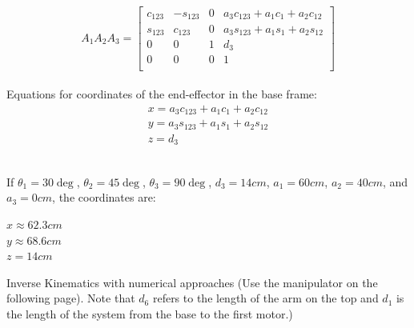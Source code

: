 \documentclass[12pt]{exam}
\begin{document}
\begin{questions}
\begin{parts}
\begin{center}
\[            \]
            \[
                A_1A_2A_3 =
                \begin{bmatrix}
                    c_{123} & -s_{123} & 0 & a_3c_{123} + a_1c_1 + a_2c_{12} \\
                    s_{123} & c_{123} & 0 & a_3s_{123} + a_1s_1 + a_2s_{12} \\
                    0 & 0 & 1 & d_3 \\
                    0 & 0 & 0 & 1 \\
                \end{bmatrix}
            \]
            \vspace{5mm} \\
            Equations for coordinates of the end-effector in the base frame:
            \\
            \begin{align}
                x = a_3c_{123} + a_1c_1 + a_2c_{12} \\
                y = a_3s_{123} + a_1s_1 + a_2s_{12} \\
                z = d_3
            \end{align}
            \\
        \end{center}
        If $\theta_1 = 30\deg$, $\theta_2 = 45\deg$, $\theta_3 = 90\deg$, $d_3 = 14 cm$, $a_1 = 60 cm$, $a_2 = 40 cm$, and $a_3 = 0 cm$, the coordinates are:
        \\
        \begin{center}
           $x \approx 62.3 cm$ \\
           $y \approx 68.6 cm$ \\
           $z = 14cm$
        \end{center}
        
\end{parts}
\newpage


\addpoints
\question[20]
    Inverse Kinematics with numerical approaches (Use the manipulator on the following page). Note that $d_6$ refers to the length of the arm on the top and $d_1$ is the length of the system from the base to the first motor.)
    
    
\noaddpoints
\begin{parts}


\end{parts}
\end{questions}
\end{document}
